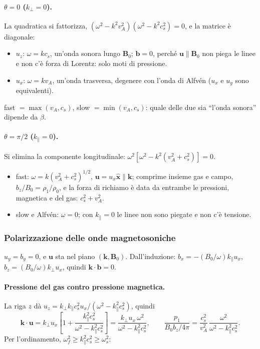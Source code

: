 \paragraph{$\theta=0$ ($k_\perp=0$).} La quadratica si fattorizza, $(\omega^2-k^2v_A^2)(\omega^2-k^2c_s^2)=0$, e la matrice è diagonale:
\begin{itemize}
\item $u_z$: $\omega=kc_s$, un'onda sonora lungo $\mathbf{B}_0$; $\mathbf{b}=0$, perché $\mathbf{u}\parallel\mathbf{B}_0$ non piega le linee e non c'è forza di Lorentz: solo moti di pressione.
\item $u_x$: $\omega=kv_A$, un'onda trasversa, degenere con l'onda di Alfvén ($u_x$ e $u_y$ sono equivalenti).
\end{itemize}
fast $=\max(v_A,c_s)$, slow $=\min(v_A,c_s)$: quale delle due sia ``l'onda sonora'' dipende da $\beta$.

\paragraph{$\theta=\pi/2$ ($k_\parallel=0$).} Si elimina la componente longitudinale: $\omega^2\left[\omega^2-k^2(v_A^2+c_s^2)\right]=0$.
\begin{itemize}
\item fast: $\omega=k(v_A^2+c_s^2)^{1/2}$, $\mathbf{u}=u_x\hat{\mathbf{x}}\parallel\mathbf{k}$; comprime insieme gas e campo, $b_z/B_0=\rho_1/\rho_0$, e la forza di richiamo è data da entrambe le pressioni, magnetica e del gas: $c_s^2+v_A^2$.
\item slow e Alfvén: $\omega=0$; con $k_\parallel=0$ le linee non sono piegate e non c'è tensione.
\end{itemize}

\subsubsection{Polarizzazione delle onde magnetosoniche}

$u_y=b_y=0$, e $\mathbf{u}$ sta nel piano $(\mathbf{k},\mathbf{B}_0)$. Dall'induzione: $b_x=-(B_0/\omega)k_\parallel u_x$, $b_z=(B_0/\omega)k_\perp u_x$, quindi $\mathbf{k}\cdot\mathbf{b}=0$.

\paragraph{Pressione del gas contro pressione magnetica.} La riga $z$ dà $u_z=k_\perp k_\parallel c_s^2u_x/(\omega^2-k_\parallel^2c_s^2)$, quindi
\begin{equation}
\mathbf{k}\cdot\mathbf{u}=k_\perp u_x\left[1+\frac{k_\parallel^2c_s^2}{\omega^2-k_\parallel^2c_s^2}\right]=\frac{k_\perp u_x\,\omega^2}{\omega^2-k_\parallel^2c_s^2},\qquad
\frac{p_1}{B_0b_z/4\pi}=\frac{c_s^2}{v_A^2}\,\frac{\omega^2}{\omega^2-k_\parallel^2c_s^2}.
\end{equation}
Per l'ordinamento, $\omega_f^2\ge k_\parallel^2c_s^2\ge\omega_s^2$:

